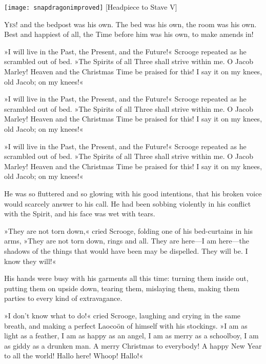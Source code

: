 \begin{minipage}[c]{\textwidth}
\texttt{[image: snapdragonimproved]}
[Headpiece to Stave V]{}
\end{minipage}

\lettrine[lines=4]{Y}{es!} and the bedpost was his own. The bed was his own, the room was his own. Best and happiest of all, the Time before him was his own, to make amends in!

\makeatletter
{}
{%
»I will live in the Past, the Present, and the Future!« Scrooge repeated as he scrambled out of bed. »The Spirits of all Three shall strive within me. O Jacob Marley! Heaven and the Christmas Time be praised for this! I say it on my knees, old Jacob; on my knees!«

}{%
\zz
»I will live in the Past, the Present, and the Future!« Scrooge repeated as he scrambled out of bed. »The Spirits of all Three shall strive within me. O Jacob Marley! Heaven and the Christmas Time be praised for this! I say it on my knees, old Jacob; on my knees!«
}
\makeatother


»I will live in the Past, the Present, and the Future!« Scrooge repeated as he scrambled out of bed. »The Spirits of all Three shall strive within me. O Jacob Marley! Heaven and the Christmas Time be praised for this! I say it on my knees, old Jacob; on my knees!«

He was so fluttered and so glowing with his good intentions, that his broken voice would scarcely answer to his call. He had been sobbing violently in his conflict with the Spirit, and his face was wet with tears.

»They are not torn down,« cried Scrooge, folding one of his bed-curtains in his arms, »They are not torn down, rings and all. They are here—I am here—the shadows of the things that would have been may be dispelled. They will be. I know they will!«

His hands were busy with his garments all this time: turning them inside out, putting them on upside down, tearing them, mislaying them, making them parties to every kind of extravagance.

»I don't know what to do!« cried Scrooge, laughing and crying in the same breath, and making a perfect Laoco\"on of himself with his stockings. »I am as light as a feather, I am as happy as an angel, I am as merry as a schoolboy, I am as giddy as a drunken man. A merry Christmas to everybody! A happy New Year to all the world! Hallo here! Whoop! Hallo!«

